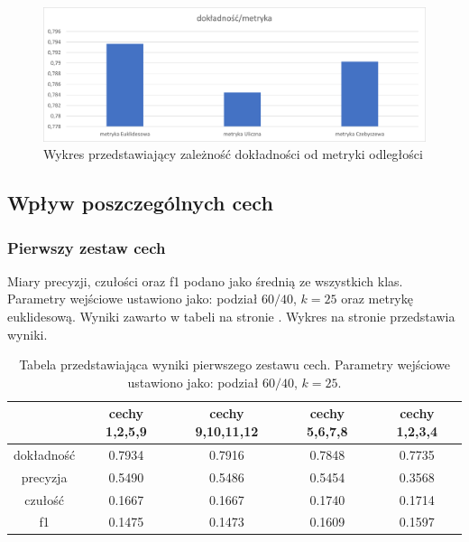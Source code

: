 \documentclass{classrep}
\begin{document}
\begin{figure}[H]
\label{accuracy_met}
\includegraphics[scale=0.75]{accuracy_metric}
\caption{Wykres przedstawiający zależność dokładności od metryki odległości}
\end{figure}


\subsection{Wpływ poszczególnych cech}


\subsubsection{Pierwszy zestaw cech}
Miary precyzji, czułości oraz f1 podano jako średnią ze wszystkich klas. Parametry wejściowe ustawiono jako: podział $60/40$, $k=25$ oraz metrykę euklidesową. Wyniki zawarto w tabeli na stronie \pageref{tf1}. Wykres na stronie \pageref{features_set_1} przedstawia wyniki.


\begin{table}[H]
\label{tf1}
\begin{tabular}{|c|c|c|c|c|}
\hline  & cechy 1,2,5,9 & cechy 9,10,11,12 & cechy 5,6,7,8 & cechy 1,2,3,4 \\
\hline \hline
dokładność & 0.7934 & 0.7916 & 0.7848 & 0.7735\\
precyzja & 0.5490 & 0.5486 & 0.5454 & 0.3568 \\
czułość & 0.1667 & 0.1667 & 0.1740 & 0.1714\\
f1 & 0.1475 & 0.1473 & 0.1609 & 0.1597 \\
\end{tabular}
\caption{Tabela przedstawiająca wyniki pierwszego zestawu cech. Parametry wejściowe ustawiono jako: podział $60/40$, $k=25$.}
\end{table}
\end{document}
